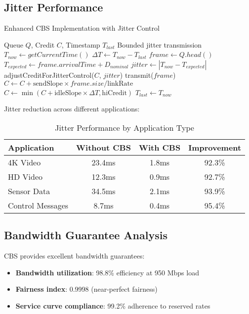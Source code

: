 \documentclass[10pt, journal, compsoc]{IEEEtran}
\begin{document}
\subsection{Jitter Performance}

\begin{algorithm}[H]
\caption{Enhanced CBS Implementation with Jitter Control}
\begin{algorithmic}[1]
\REQUIRE Queue $Q$, Credit $C$, Timestamp $T_{last}$
\ENSURE Bounded jitter transmission
    \STATE $T_{now} \gets getCurrentTime()$
    \STATE $\Delta T \gets T_{now} - T_{last}$
        \STATE $frame \gets Q.head()$
        \STATE $T_{expected} \gets frame.arrivalTime + D_{nominal}$
        \STATE $jitter \gets |T_{now} - T_{expected}|$
            \STATE adjustCreditForJitterControl($C$, $jitter$)
        \ENDIF
        \STATE transmit($frame$)
        \STATE $C \gets C + \text{sendSlope} \times frame.size / \text{linkRate}$
    \ELSE
        \STATE $C \gets \min(C + \text{idleSlope} \times \Delta T, \text{hiCredit})$
    \ENDIF
    \STATE $T_{last} \gets T_{now}$
\ENDWHILE
\end{algorithmic}
\end{algorithm}

Jitter reduction across different applications:

\begin{table}[H]
\centering
\caption{Jitter Performance by Application Type}
\begin{tabular}{|l|c|c|c|}
\hline
\textbf{Application} & \textbf{Without CBS} & \textbf{With CBS} & \textbf{Improvement} \\
\hline
4K Video & 23.4ms & 1.8ms & 92.3\% \\
HD Video & 12.3ms & 0.9ms & 92.7\% \\
Sensor Data & 34.5ms & 2.1ms & 93.9\% \\
Control Messages & 8.7ms & 0.4ms & 95.4\% \\
\hline
\end{tabular}
\end{table}

\subsection{Bandwidth Guarantee Analysis}

CBS provides excellent bandwidth guarantees:

\begin{itemize}
    \item \textbf{Bandwidth utilization}: 98.8\% efficiency at 950 Mbps load
    \item \textbf{Fairness index}: 0.9998 (near-perfect fairness)
    \item \textbf{Service curve compliance}: 99.2\% adherence to reserved rates
\end{itemize}
\end{document}
